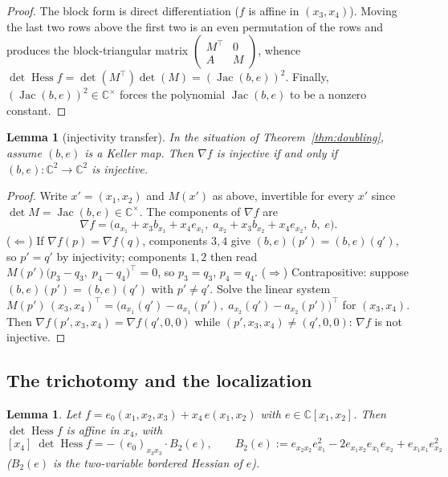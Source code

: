 \documentclass[11pt]{article}
\theoremstyle{plain}
\newtheorem{lemma}[theorem]{Lemma}
\theoremstyle{definition}
\newcommand{\C}{\mathbb{C}}
\newcommand{\Hess}{\operatorname{Hess}}
\newcommand{\Jac}{\operatorname{Jac}}
\begin{document}
\begin{proof}
The block form is direct differentiation ($f$ is affine in
$(x_3,x_4)$). Moving the last two rows above the first two is an even
permutation of the rows and produces the block-triangular matrix
$\left(\begin{smallmatrix}M^{\top}&0\\ A&M\end{smallmatrix}\right)$,
whence $\det\Hess f=\det(M^{\top})\det(M)=(\Jac(b,e))^2$. Finally,
$(\Jac(b,e))^2\in\C^{\times}$ forces the polynomial $\Jac(b,e)$ to be a
nonzero constant.
\end{proof}

\begin{lemma}[injectivity transfer]\label{lem:inj}
In the situation of Theorem~\ref{thm:doubling}, assume $(b,e)$ is a
Keller map. Then $\nabla f$ is injective if and only if
$(b,e):\C^2\to\C^2$ is injective.
\end{lemma}

\begin{proof}
Write $x'=(x_1,x_2)$ and $M(x')$ as above, invertible for every $x'$
since $\det M=\Jac(b,e)\in\C^{\times}$. The components of $\nabla f$ are
\[
\nabla f=\bigl(a_{x_1}+x_3b_{x_1}+x_4e_{x_1},\;
a_{x_2}+x_3b_{x_2}+x_4e_{x_2},\;b,\;e\bigr).
\]
($\Leftarrow$) If $\nabla f(p)=\nabla f(q)$, components $3,4$ give
$(b,e)(p')=(b,e)(q')$, so $p'=q'$ by injectivity; components $1,2$ then
read $M(p')\bigl(p_3-q_3,\;p_4-q_4\bigr)^{\top}=0$, so $p_3=q_3$,
$p_4=q_4$.
($\Rightarrow$) Contrapositive: suppose $(b,e)(p')=(b,e)(q')$ with
$p'\ne q'$. Solve the linear system
$M(p')\,(x_3,x_4)^{\top}
=\bigl(a_{x_1}(q')-a_{x_1}(p'),\;a_{x_2}(q')-a_{x_2}(p')\bigr)^{\top}$
for $(x_3,x_4)$. Then
$\nabla f(p',x_3,x_4)=\nabla f(q',0,0)$ while
$(p',x_3,x_4)\ne(q',0,0)$: $\nabla f$ is not injective.
\end{proof}

\subsection{The trichotomy and the localization}

\begin{lemma}\label{lem:affx4}
Let $f=e_0(x_1,x_2,x_3)+x_4\,e(x_1,x_2)$ with $e\in\C[x_1,x_2]$. Then
$\det\Hess f$ is \emph{affine} in $x_4$, with
\[
[x_4]\;\det\Hess f
=-\,(e_0)_{x_3x_3}\cdot B_2(e),
\qquad
B_2(e):=e_{x_2x_2}e_{x_1}^2-2e_{x_1x_2}e_{x_1}e_{x_2}
+e_{x_1x_1}e_{x_2}^2
\]
($B_2(e)$ is the two-variable bordered Hessian of $e$).
\end{lemma}
\end{document}
